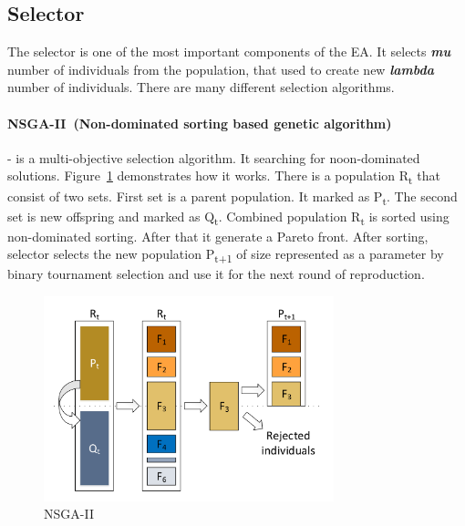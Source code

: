\subsection{Selector}\label{sec:GeneticAlgorithm:Selector}

The selector is one of the most important components of the EA. It selects \textit{\textbf{mu}} number of individuals from the population, that used to create new \textit{\textbf{lambda}} number of individuals. There are many different selection algorithms.


\paragraph{NSGA-II~(Non-dominated sorting based genetic algorithm)~\cite{deb2000}} - is a multi-objective selection algorithm. It searching for noon-dominated solutions. Figure~\ref{fig:nsga2} demonstrates how it works. There is a population \texorpdfstring{R\textsubscript{t}}{R t} that consist of two sets. First set is a parent population. It marked as \texorpdfstring{P\textsubscript{t}}{P t}. The second set is new offspring and marked as \texorpdfstring{Q\textsubscript{t}}{Q t}. Combined population \texorpdfstring{R\textsubscript{t}}{R t} is sorted using non-dominated sorting. After that it generate a Pareto front. After sorting, selector selects the new population \texorpdfstring{P\textsubscript{t+1}}{P t+1} of size represented as a parameter by binary tournament selection and use it for the next round of reproduction.

\begin{figure}
	\centering
	\includegraphics[width=0.75\textwidth]{images/nsga2.pdf}
	\caption[NSGA-II]{NSGA-II}
	\label{fig:nsga2}
\end{figure}

